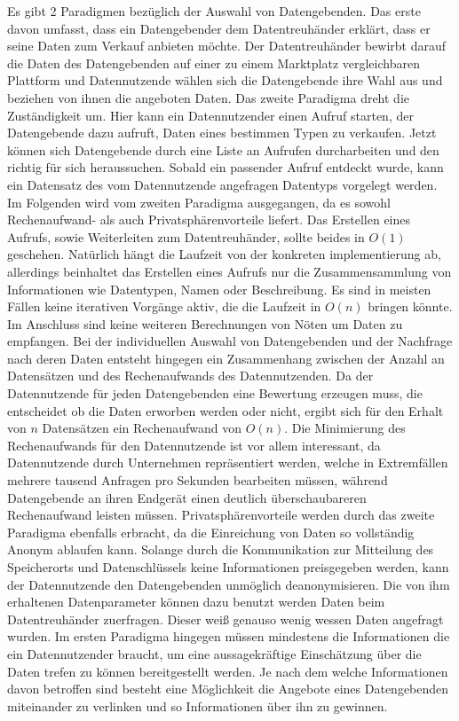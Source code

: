 \documentclass[11pt,a4paper]{scrreprt}
\begin{document}
Es gibt 2 Paradigmen bezüglich der Auswahl von Datengebenden. Das erste davon umfasst, dass ein Datengebender dem Datentreuhänder erklärt, dass er seine Daten zum Verkauf anbieten möchte. Der Datentreuhänder bewirbt darauf die Daten des Datengebenden auf einer zu einem Marktplatz vergleichbaren Plattform und Datennutzende wählen sich die Datengebende ihre Wahl aus und beziehen von ihnen die angeboten Daten. Das zweite Paradigma dreht die Zuständigkeit um. Hier kann ein Datennutzender einen Aufruf starten, der Datengebende dazu aufruft, Daten eines bestimmen Typen zu verkaufen. Jetzt können sich Datengebende durch eine Liste an Aufrufen durcharbeiten und den richtig für sich heraussuchen. Sobald ein passender Aufruf entdeckt wurde, kann ein Datensatz des vom Datennutzende angefragen Datentyps vorgelegt werden. 
Im Folgenden wird vom zweiten Paradigma ausgegangen, da es sowohl Rechenaufwand- als auch Privatsphärenvorteile liefert. Das Erstellen eines Aufrufs, sowie Weiterleiten zum Datentreuhänder, sollte beides in $O(1)$ geschehen. Natürlich hängt die Laufzeit von der konkreten implementierung ab, allerdings beinhaltet das Erstellen eines Aufrufs nur die Zusammensammlung von Informationen wie Datentypen, Namen oder Beschreibung. Es sind in meisten Fällen keine iterativen Vorgänge aktiv, die die Laufzeit in $O(n)$ bringen könnte. Im Anschluss sind keine weiteren Berechnungen von Nöten um Daten zu empfangen. Bei der individuellen Auswahl von Datengebenden und der Nachfrage nach deren Daten entsteht hingegen ein Zusammenhang zwischen der Anzahl an Datensätzen und des Rechenaufwands des Datennutzenden. Da der Datennutzende für jeden Datengebenden eine Bewertung erzeugen muss, die entscheidet ob die Daten erworben werden oder nicht, ergibt sich für den Erhalt von $n$ Datensätzen ein Rechenaufwand von $O(n)$. Die Minimierung des Rechenaufwands für den Datennutzende ist vor allem interessant, da Datennutzende durch Unternehmen repräsentiert werden, welche in Extremfällen mehrere tausend Anfragen pro Sekunden bearbeiten müssen, während Datengebende an ihren Endgerät einen deutlich überschaubareren Rechenaufwand leisten müssen.
Privatsphärenvorteile werden durch das zweite Paradigma ebenfalls erbracht, da die Einreichung von Daten so vollständig Anonym ablaufen kann. Solange durch die Kommunikation zur Mitteilung des Speicherorts und Datenschlüssels keine Informationen preisgegeben werden, kann der Datennutzende den Datengebenden unmöglich deanonymisieren. Die von ihm erhaltenen Datenparameter können dazu benutzt werden Daten beim Datentreuhänder zuerfragen. Dieser weiß genauso wenig wessen Daten angefragt wurden. Im ersten Paradigma hingegen müssen mindestens die Informationen die ein Datennutzender braucht, um eine aussagekräftige Einschätzung über die Daten trefen zu können bereitgestellt werden. Je nach dem welche Informationen davon betroffen sind besteht eine Möglichkeit die Angebote eines Datengebenden miteinander zu verlinken und so Informationen über ihn zu gewinnen.
\end{document}
